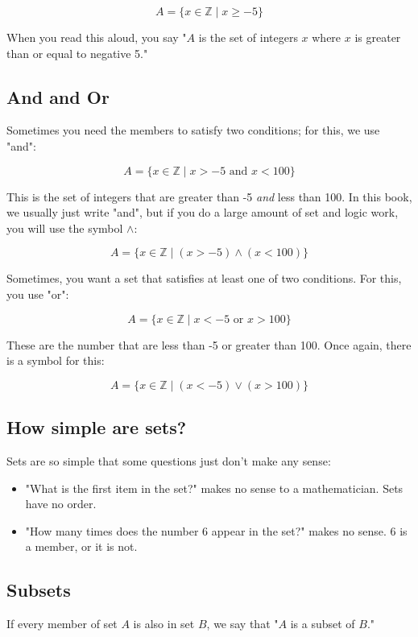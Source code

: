 $$A = \{ x \in \mathbb{Z} \mid x \geq -5 \}$$

When you read this aloud, you say "$A$ is the set of integers $x$
where $x$ is greater than or equal to negative 5."

\subsection{And and Or}

Sometimes you need the members to satisfy two conditions; for this, we
use "and": 

$$A = \{ x \in \mathbb{Z} \mid x > -5 \text{ and }  x < 100\}$$

This is the set of integers that are greater than -5 \textit{and} less
than 100.  In this book, we usually just write "and", but if you do a
large amount of set and logic work, you will use the symbol $\land$:

$$A = \{ x \in \mathbb{Z} \mid (x > -5) \land (x < 100)\}$$

Sometimes, you want a set that satisfies at least one of two
conditions.  For this, you use "or":

$$A = \{ x \in \mathbb{Z} \mid x < -5 \text{ or } x > 100\}$$

These are the number that are less than -5 or greater than 100.  Once
again, there is a symbol for this:

$$A = \{ x \in \mathbb{Z} \mid (x < -5) \lor (x > 100)\}$$
\subsection{How simple are sets?}

Sets are so simple that some questions just don't make any sense:
\begin{itemize}
\item "What is the first item in the set?" makes no sense to a mathematician.  Sets have no order.
\item "How many times does the number 6 appear in the set?"  makes no sense.   6 is a member, or it is not.   
\end{itemize}

\subsection{Subsets}

If every member of set $A$ is also in set $B$, we say that "$A$ is a
subset of $B$." 

